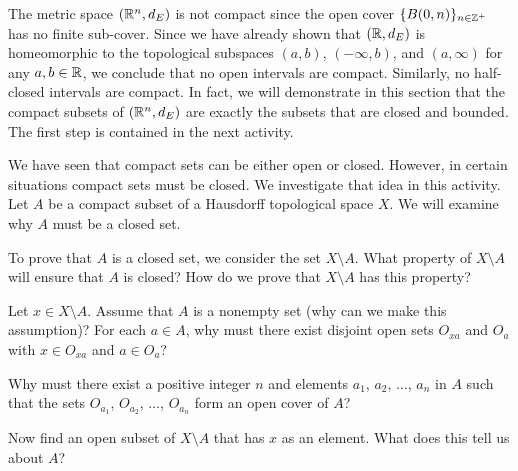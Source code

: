 \label{sec_compact_rn}

The metric space $(\mathbb{R}^n,d_E)$ is not compact since the open cover $\{B(0, n)\}_{n \in \mathbb{Z}^+}$ has no finite sub-cover.  Since we have already shown that $(\mathbb{R},d_E)$ is homeomorphic to the topological subspaces $(a,b)$, $(-\infty, b)$, and $(a,\infty)$ for any $a, b \in \mathbb{R}$, we conclude that no open intervals are compact. Similarly, no half-closed intervals are compact. In fact, we will demonstrate in this section that the compact subsets of $(\mathbb{R}^n, d_E)$ are exactly the subsets that are closed and bounded. The first step is contained in the next activity.

\begin{activity} \label{act:metric_compact_closed} We have seen that compact sets can be either open or closed. However, in certain situations compact sets must be closed. We investigate that idea in this activity. Let $A$ be a compact subset of a Hausdorff topological space $X$. We will examine why $A$ must be a closed set.
\ba
\item To prove that $A$ is a closed set, we consider the set $X \setminus A$. What property of $X \setminus A$ will ensure that $A$ is closed? How do we prove that $X \setminus A$ has this property?

\item Let $x \in X \setminus A$. Assume that $A$ is a nonempty set (why can we make this assumption)? For each $a \in A$, why must there exist disjoint open sets $O_{xa}$ and $O_a$ with $x \in O_{xa}$ and $a \in O_a$? 

\item Why must there exist a positive integer $n$ and elements $a_1$, $a_2$, $\ldots$, $a_n$ in $A$ such that the sets $O_{a_1}$, $O_{a_2}$, $\ldots$, $O_{a_n}$ form an open cover of $A$?

\item Now find an open subset of $X \setminus A$ that has $x$ as an element. What does this tell us about $A$?

\ea

\end{activity}

